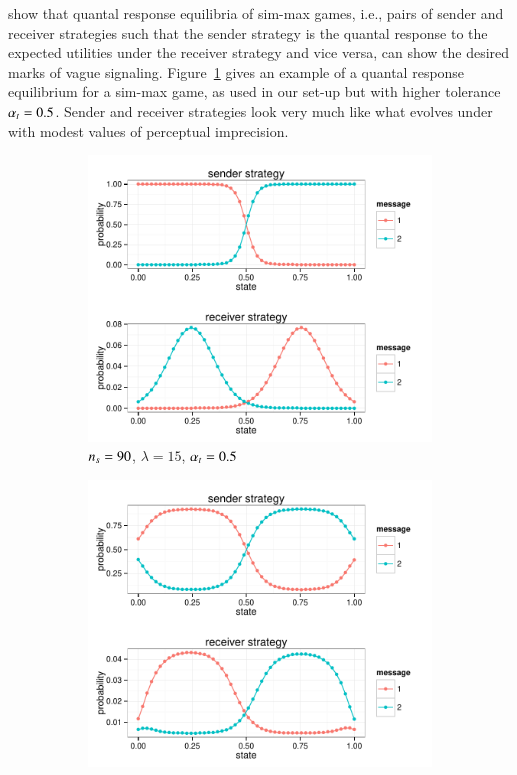 \citet{FrankeJager2010:Vagueness-Signa} show that quantal response
equilibria of sim-max games, i.e., pairs of sender and receiver
strategies such that the sender strategy is the quantal response to
the expected utilities under the receiver strategy and vice versa, can
show the desired marks of vague
signaling. Figure~\ref{fig:exampleQRE_stratsA} gives an example of a
quantal response equilibrium for a sim-max game, as used in our set-up
but with higher tolerance $\alpha_t = 0.5$. Sender and receiver
strategies look very much like what evolves under \rdd with modest
values of perceptual imprecision. 

\begin{figure}
  \centering
  
  \begin{subfigure}[]{0.45\textwidth}
    \includegraphics[width=\textwidth]{plots/exampleStratQRE_tolerance05.pdf}
    \caption{$n_s = 90$, $\lambda = 15$, $\alpha_t = 0.5$}
    \label{fig:exampleQRE_stratsA}
  \end{subfigure}
  \hfill
  \begin{subfigure}[]{0.45\textwidth}
    \includegraphics[width=\textwidth]{plots/exampleStratQRE_tolerance005.pdf}

\end{subfigure}
\end{figure}
